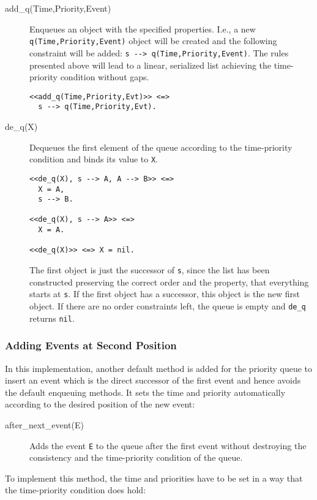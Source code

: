\begin{description}
 \item[add\_q(Time,Priority,Event)] Enqueues an object with the specified properties. I.e., a new \lstinline|q(Time,Priority,Event)| object will be created and the following constraint will be added: \lstinline|s --> q(Time,Priority,Event)|. The rules presented above will lead to a linear, serialized list achieving the time-priority condition without gaps.
\begin{lstlisting}
<<add_q(Time,Priority,Evt)>> <=>
  s --> q(Time,Priority,Evt).
\end{lstlisting}
 \item[de\_q(X)] Dequeues the first element of the queue according to the time-priority condition and binds its value to \lstinline|X|.
\begin{lstlisting}
<<de_q(X), s --> A, A --> B>> <=>
  X = A,
  s --> B.

<<de_q(X), s --> A>> <=>
  X = A.  
  
<<de_q(X)>> <=> X = nil.
\end{lstlisting}

The first object is just the successor of \lstinline|s|, since the list has been constructed preserving the correct order and the property, that everything starts at \lstinline|s|. If the first object has a successor, this object is the new first object. If there are no order constraints left, the queue is empty and \lstinline|de_q| returns \lstinline|nil|.
\end{description}

\subsubsection{Adding Events at Second Position}

In this implementation, another default method is added for the priority queue to insert an event which is the direct successor of the first event and hence avoids the default enqueuing methods. It sets the time and priority automatically according to the desired position of the new event:

\begin{description}
 \item[after\_next\_event(E)] Adds the event \lstinline|E| to the queue after the first event without destroying the consistency and the time-priority condition of the queue.
\end{description}

To implement this method, the time and priorities have to be set in a way that the time-priority condition does hold:

